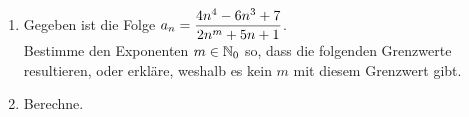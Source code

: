 \documentclass[11pt,oneside]{article}
\begin{document}
\begin{aufgabe}
	\begin{enumerate}
		\item Gegeben ist die Folge $\displaystyle a_n=\frac{4n^4-6n^3+7}{2n^m+5n+1}$.\vspace{2pt}\\Bestimme den Exponenten $m\in\mathbb{N}_0$ so, dass die folgenden Grenzwerte resultieren, oder erkläre, weshalb es kein $m$ mit diesem Grenzwert gibt.
		\item Berechne.
	\end{enumerate}
\end{aufgabe}\newpage
\end{document}

